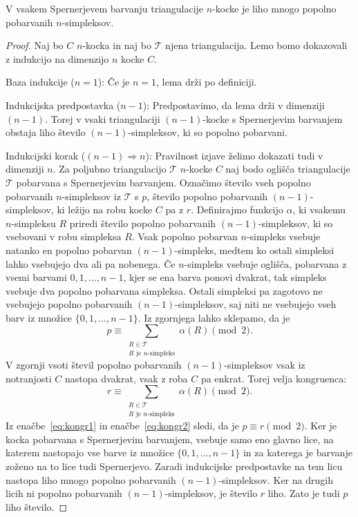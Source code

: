\documentclass[mat1]{fmfdelo}
\newcommand{\0}{0}
\newcommand{\pT}{\mathcal T}
\begin{document}
\begin{lema}\label{izr:kubsperner}
V vsakem Spernerjevem barvanju triangulacije $n$-kocke je liho mnogo popolno pobarvanih $n$-simpleksov.
\end{lema}
\begin{proof}
Naj bo $C$ $n$-kocka in naj bo $\pT$ njena triangulacija. Lemo bomo dokazovali z indukcijo na dimenzijo $n$ kocke $C$.

Baza indukcije ($n = 1$):
Če je $n = 1$, lema drži po definiciji.

Indukcijska predpostavka ($n - 1$):
Predpostavimo, da lema drži v dimenziji $(n - 1)$. Torej v vsaki triangulaciji $(n - 1)$-kocke s Spernerjevim barvanjem obstaja liho število $(n - 1)$-simpleksov, ki so popolno pobarvani.

Indukcijski korak ($(n - 1) \Longrightarrow n$):
Pravilnost izjave želimo dokazati tudi v dimenziji $n$. Za poljubno triangulacijo $\pT$ $n$-kocke $C$ naj bodo oglišča triangulacije $\pT$ pobarvana s Spernerjevim barvanjem. Označimo število vseh popolno pobarvanih $n$-simpleksov iz $\pT$ s $p$, število popolno pobarvanih $(n-1)$-simpleksov, ki ležijo na robu kocke $C$ pa z $r$. Definirajmo funkcijo $\alpha$, ki vsakemu $n$-simpleksu $R$ priredi število popolno pobarvanih $(n-1)$-simpleksov, ki so vsebovani v robu simpleksa $R$. Vsak popolno pobarvan $n$-simpleks vsebuje natanko en popolno pobarvan $(n-1)$-simpleks, medtem ko ostali simpleksi lahko vsebujejo dva ali pa nobenega. Če $n$-simpleks vsebuje oglišča, pobarvana z vsemi barvami $0, 1, \dots, n-1$, kjer se ena barva ponovi dvakrat, tak simpleks vsebuje dva popolno pobarvana simpleksa. Ostali simpleksi pa zagotovo ne vsebujejo popolno pobarvanih $(n - 1)$-simpleksov, saj niti ne vsebujejo vseh barv iz množice $\{0, 1, \dots, n-1 \}$. Iz zgornjega lahko sklepamo, da je
\begin{equation}\label{eq:kongr1}
p \equiv 
\sum\limits_{\substack{
R \in \pT
 \\ 
R\text{ je } n\text{-simpleks}
 }}
  \alpha(R) \pmod 2.
\end{equation}
V zgornji vsoti števil popolno pobarvanih $(n - 1)$-simpleksov vsak iz notranjosti $C$ nastopa dvakrat, vsak z roba $C$ pa enkrat. Torej velja kongruenca:
\begin{equation}\label{eq:kongr2}
r \equiv 
\sum\limits_{\substack{
R \in \pT
 \\ 
R\text{ je } n\text{-simpleks}
 }}
  \alpha(R) \pmod 2.
\end{equation}
Iz enačbe~\eqref{eq:kongr1} in enačbe~\eqref{eq:kongr2} sledi, da je $p \equiv r \pmod 2$.
Ker je kocka pobarvana s Spernerjevim barvanjem, vsebuje samo eno glavno lice, na katerem nastopajo vse barve iz množice $\{0, 1, \dots, n-1\}$ in za katerega je barvanje zoženo na to lice tudi Spernerjevo. Zaradi indukcijske predpostavke na tem licu nastopa liho mnogo popolno pobarvanih $(n - 1)$-simpleksov. Ker na drugih licih ni popolno pobarvanih $(n - 1)$-simpleksov, je število $r$ liho. Zato je tudi $p$ liho število.
\end{proof}
\end{document}
